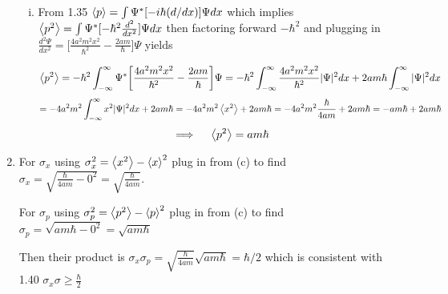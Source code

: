 \documentclass[12pt]{exam}
\begin{document}
\begin{solution}
\begin{enumerate}
\begin{enumerate}[(i)]
            \item From 1.35 $\expval{p} = \int \Psi^* [-i\hbar (d/dx)]\Psi dx$ which implies $\expval{p^2} = \int \Psi^* [-\hbar^2 \frac{d^2}{dx^2}] \Psi dx$ then factoring forward $-\hbar^2$ and plugging in $\frac{d^2\Psi}{dx^2} = \big[ \frac{4a^2m^2x^2}{\hbar^2} -\frac{2am}{\hbar}\big]\Psi$ yields 
            
            $$\expval{p^2} = -\hbar^2\int^\infty_{-\infty} \Psi^*\bigg[ \frac{4a^2m^2x^2}{\hbar^2} -\frac{2am}{\hbar}\bigg]\Psi = -\hbar^2\int^\infty_{-\infty} \frac{4a^2m^2x^2}{\hbar^2}|\Psi|^2 dx+2am\hbar \int^\infty_{-\infty} |\Psi|^2dx$$
            $$
            = -4a^2m^2\int^\infty_{-\infty} x^2|\Psi|^2 dx +2am\hbar = -4a^2m^2\expval{x^2} +2am\hbar = -4a^2m^2\frac{\hbar}{4am} +2am\hbar = -am\hbar +2am\hbar$$
            $$\implies \quad \expval{p^2} = am\hbar$$
        \end{enumerate}

        \item For $\sigma_x$ using $\sigma_x^2 =\expval{x^2}-\expval{x}^2$ plug in from (c) to find $\sigma_x = \sqrt{\frac{\hbar}{4am}- 0^2} = \sqrt{\frac{\hbar}{4am}}$.

        For $\sigma_p$ using $\sigma_p^2 = \expval{p^2}-\expval{p}^2$ plug in from (c) to find $\sigma_p = \sqrt{am\hbar -0^2} = \sqrt{am\hbar}$

        Then their product is $\sigma_x\sigma
        _p = \sqrt{\frac{\hbar}{4am}}\sqrt{am\hbar} = \hbar/2$ which is consistent with 1.40 $\sigma_x\sigma \geq \frac{\hbar}{2}$
    \end{enumerate}
\end{solution}
\end{document}
